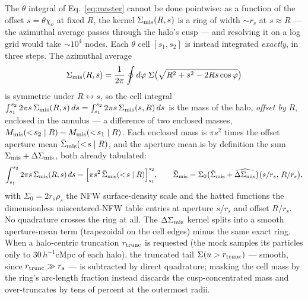 The $\theta$ integral of Eq.~\eqref{eq:master} cannot be done pointwise:
as a function of the offset $s = \theta\chi_o$ at fixed $R$, the kernel
$\Sigma_{\rm mis}(R, s)$ is a ring of width $\sim r_s$ at $s \approx R$ --- the
azimuthal average passes through the halo's cusp --- and resolving it on
a log grid would take $\sim\!10^4$ nodes. Each $\theta$ cell
$[s_1, s_2]$ is instead integrated \emph{exactly}, in three steps. The
azimuthal average
\begin{equation}
\Sigma_{\rm mis}(R, s) = \frac{1}{2\pi}\oint d\varphi\;
  \Sigma\big(\sqrt{R^2 + s^2 - 2Rs\cos\varphi}\big)
\label{eq:smisdef}
\end{equation}
is symmetric under $R \leftrightarrow s$, so the cell integral
$\int_{s_1}^{s_2} 2\pi s\, \Sigma_{\rm mis}(R, s)\, ds = \int_{s_1}^{s_2} 2\pi s\,
\Sigma_{\rm mis}(s, R)\, ds$ is the mass of the halo, \emph{offset by} $R$,
enclosed in the annulus --- a difference of two enclosed masses,
$M_{\rm mis}(<\!s_2 \mid R) - M_{\rm mis}(<\!s_1 \mid R)$. Each enclosed
mass is $\pi s^2$ times the offset aperture mean
$\bar\Sigma_{\rm mis}(<\!s \mid R)$, and the aperture mean is by
definition the sum $\Sigma_{\rm mis} + \Delta\Sigma_{\rm mis}$, both already tabulated:
\begin{equation}
\int_{s_1}^{s_2} 2\pi s\,\Sigma_{\rm mis}(R, s)\, ds
= \Big[\pi s^2\, \bar\Sigma_{\rm mis}(<\!s \mid R)\Big]_{s_1}^{s_2},
\qquad
\bar\Sigma_{\rm mis} = \Sigma_0\big(\hat\Sigma_{\rm mis}
+ \widehat{\Delta\Sigma_{\rm mis}}\big)\big(s/r_s,\, R/r_s\big),
\label{eq:cellmass}
\end{equation}
with $\Sigma_0 = 2 r_s \rho_s$ the NFW surface-density scale and the
hatted functions the dimensionless miscentered-NFW table entries at
aperture $s/r_s$ and offset $R/r_s$. No quadrature crosses the ring at
all. The $\Delta\Sigma_{\rm mis}$ kernel splits into a smooth aperture-mean term
(trapezoidal on the cell edges) minus the same exact ring. When a halo-centric truncation $r_{\rm trunc}$ is
requested (the mock samples its particles only to $30\,h^{-1}$cMpc of
each halo), the truncated tail $\Sigma(u > r_{\rm trunc})$ --- smooth,
since $r_{\rm trunc} \gg r_s$ --- is subtracted by direct quadrature;
masking the cell mass by the ring's arc-length fraction instead discards
the cusp-concentrated mass and over-truncates by tens of percent at the
outermost radii.

